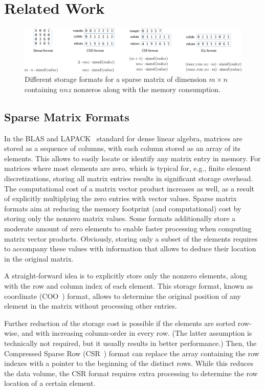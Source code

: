 \section{Related Work}
\label{s2-related}

\begin{figure}
\centering
\includegraphics[width=\textwidth]{plots/formats}
\caption{Different storage formats for a sparse matrix of dimension $m\times n$ containing $nnz$ nonzeros along with the memory consumption.}
\label{fig:formatoverview}
\end{figure}

\subsection{Sparse Matrix Formats}
In the BLAS and LAPACK~\cite{lapack} standard for dense linear algebra, 
matrices are stored as a sequence of columns, with each column stored as an
array of its elements.
This allows to easily locate or identify any matrix entry in memory.
For matrices where most elements are zero, which is typical for, e.g., finite
element discretizations,
storing all matrix entries results in significant storage overhead.
The computational cost of a matrix vector product increases as well, as a result
of explicitly multiplying the zero entries with vector values.
Sparse matrix formats aim at reducing the memory footprint (and computational) 
cost by storing only the nonzero matrix values. Some formats additionally store
a moderate amount of zero elements to enable faster processing when computing
matrix vector products. Obviously, storing only a subset of the elements
requires to accompany these values with information that allows to deduce their
location in the original matrix.

A straight-forward idea is to explicitly store only the nonzero elements,
along with the row and column index of each element.
This storage format, known as coordinate (COO~\cite{barrettemplates}) format,
allows to determine the original position of any element
in the matrix without processing other entries.

Further reduction of the storage cost is possible if the elements are
sorted row-wise, and with increasing column-order in every row.
(The latter assumption is technically not required,
but it usually results in better performance.)
Then, the Compressed Sparse Row (CSR~\cite{barrettemplates}) format
can replace the array containing the row indexes with a pointer to the
beginning
of the distinct rows. While this reduces the data volume,
the CSR format requires extra processing to determine the row location of
a certain element.


